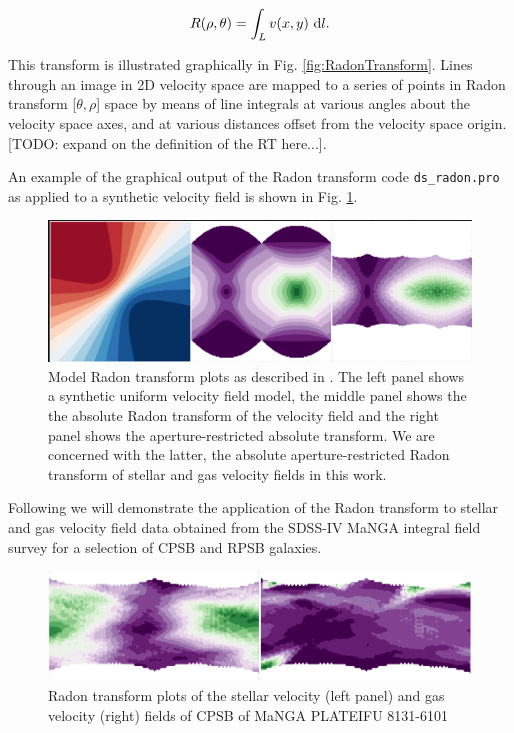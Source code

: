 \begin{equation}
    \label{eqn:radon}
    R(\rho,\theta)=\int_{L}{v(x,y)\, \mathop{}\!\mathrm{d} l}.
\end{equation}

This transform is illustrated graphically in Fig. \ref{fig:RadonTransform}. Lines through an image in 2D velocity space are mapped to a series of points in Radon transform [$\theta,\rho$] space by means of line integrals at various angles about the velocity space axes, and at various distances offset from the velocity space origin. [TODO: expand on the definition of the RT here...]. 

An example of the graphical output of the \citet{2018MNRAS.480.2217S} Radon transform code \texttt{ds\_radon.pro} as applied to a synthetic velocity field is shown in Fig. \ref{fig:Radon}.

\begin{figure}
    \centering
   	\includegraphics[width=\columnwidth]{images/RadonPlots/example2.png}
    \caption{Model Radon transform plots as described in \citet{2018MNRAS.480.2217S}. The left panel shows a synthetic uniform velocity field model, the middle panel shows the the absolute Radon transform of the velocity field and the right panel shows the aperture-restricted absolute transform. We are concerned with the latter, the absolute aperture-restricted  Radon transform of stellar and gas velocity fields in this work.}
    \label{fig:Radon}
\end{figure}

Following \citet{2018MNRAS.480.2217S} we will demonstrate the application of the Radon transform to stellar and gas velocity field data obtained from the SDSS-IV MaNGA integral field survey for a selection of CPSB and RPSB galaxies.  


\begin{figure}
    \centering
   	\includegraphics[width=\columnwidth]{images/RadonPlots/RT-snips/CPSB-8313-6101-RT-snip.png}
    \caption{Radon transform plots of the stellar velocity (left panel) and gas velocity (right) fields of CPSB of MaNGA PLATEIFU 8131-6101}
    \label{fig:RT_8131-6101}
\end{figure}


